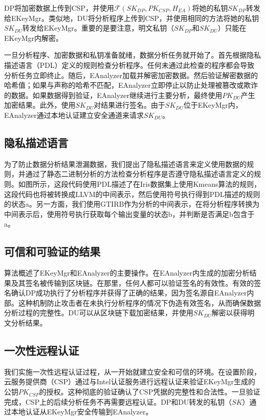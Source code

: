 DP将加密数据上传到CSP，并使用$\mathcal{F}(SK_{DP}, PK_{CSP}, H_{EA})$将她的私钥$SK_{DP}$转发给EKeyMgr。类似地，DU将分析程序上传到CSP，并使用相同的方法将她的私钥$SK_{DU}$转发给EKeyMgr。重要的是要注意，明文私钥（$SK_{DP}$和$SK_{DU}$）只能在EKeyMgr内解密。

一旦分析程序、加密数据和私钥准备就绪，数据分析任务就开始了。首先根据隐私描述语言（PDL）定义的规则检查分析程序。任何未通过此检查的程序都会导致分析任务立即终止。随后，EAnalyzer加载并解密加密数据。然后验证解密数据的哈希值；如果与声称的哈希不匹配，EAnalyzer立即停止以防止处理被篡改或欺诈的数据。如果数据得到验证，EAnalyzer继续进行主要分析，最终使用$PK_{DU}$产生加密结果。此外，使用$SK_{DU}$对结果进行签名。由于$SK_{DU}$位于EKeyMgr内，EAnalyzer通过本地认证建立安全通道来请求$SK_{DU}$。

\subsection{隐私描述语言}
为了防止数据分析结果泄漏数据，我们提出了隐私描述语言来定义使用数据的规则，并通过了静态二进制分析的方法检查分析程序是否遵守隐私描述语言定义的规则。如图所示，这段代码使用PDL描述了在Iris数据集上使用Kmeans算法的规则，这段代码也将被转换成LLVM的中间表示，然后使用符号执行得到PDL描述的规则的状态a。另一方面，我们使用GTIRB作为分析的中间表示，在将分析程序转换为中间表示后，使用符号执行获取每个输出变量的状态b，并判断是否满足b包含于a。

\subsection{可信和可验证的结果}
算法概述了EKeyMgr和EAnalyzer的主要操作。在EAnalyzer内生成的加密分析结果及其签名被传输到区块链。在那里，任何人都可以验证签名的有效性。有效的签名确认DP成功执行了分析程序并获得了正确的结果，因为签名源自EAnalyzer内部。这种机制防止攻击者在未执行分析程序的情况下伪造有效签名，从而确保数据分析过程的完整性。DU可以从区块链下载加密结果，并使用$SK_{DU}$解密以获得明文分析结果。

\subsection{一次性远程认证}
我们实施一次性远程认证过程，从一开始就建立安全和可信的环境。在设置阶段，云服务提供商（CSP）通过与Intel认证服务进行远程认证来验证EKeyMgr生成的公钥$PK_{CSP}$的授权。这种彻底的验证确认了CSP凭据的完整性和合法性。一旦验证完成，CSP上的后续分析任务不再需要远程认证。DP和DU转发的私钥（$SK$）通过本地认证从EKeyMgr安全传输到EAnalyzer。 